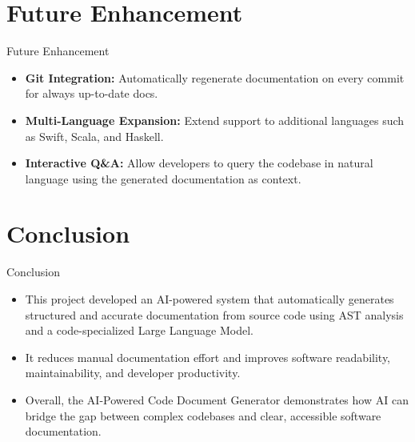 \documentclass{beamer}
\begin{document}


\section{Future Enhancement}

\begin{frame}{Future Enhancement}
\justifying
\begin{itemize}
\justifying
    \item \textbf{Git Integration:} Automatically regenerate
    documentation on every commit for always up-to-date
    docs.
    
    \item \textbf{Multi-Language Expansion:} Extend support
    to additional languages such as Swift, Scala, and
    Haskell.
    \item \textbf{Interactive Q\&A:} Allow developers to
    query the codebase in natural language using the
    generated documentation as context.
   
\end{itemize}
\end{frame}

\section{Conclusion}
\begin{frame}{Conclusion}

\begin{itemize}
\justifying
    \item This project developed an AI-powered system that
    automatically generates structured and accurate
    documentation from source code using AST analysis
    and a code-specialized Large Language Model.

\item It reduces manual documentation effort and improves
    software readability, maintainability, and developer
    productivity.

\item Overall, the AI-Powered Code Document Generator
    demonstrates how AI can bridge the gap between complex
    codebases and clear, accessible software documentation.
\end{itemize}
\end{frame}
\end{document}
